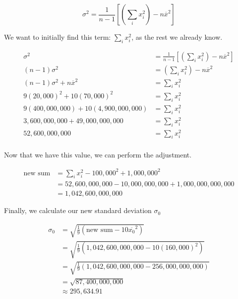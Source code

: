 \documentclass[12pt,letterpaper]{article}
\begin{document}
\begin{enumerate}
\begin{enumerate}
\begin{enumerate}[label=(\arabic*)]
              \[
                \sigma^2 = \frac{1}{n - 1} \left[\left(\sum_{i} x_i^2\right) - n \overline{x}^2\right]
              \]

              We want to initially find this term: $\sum_{i} x_i^2$, as the rest we already know.

              \begin{align*}
                \sigma^2 &= \frac{1}{n - 1} \left[\left(\sum_{i} x_i^2\right) - n \overline{x}^2\right] \\
                (n - 1) \sigma^2 &= \left(\sum_{i} x_i^2\right) - n \overline{x}^2 \\
                (n - 1) \sigma^2 + n \overline{x}^2 &= \sum_{i} x_i^2 \\
                9 (20,000)^2 + 10 (70,000)^2 &= \sum_{i} x_i^2 \\
                9 (400,000,000) + 10 (4,900,000,000) &= \sum_{i} x_i^2 \\
                3,600,000,000 + 49,000,000,000 &= \sum_{i} x_i^2 \\
                52,600,000,000 &= \sum_{i} x_i^2 \\
              \end{align*}

              Now that we have this value,
              we can perform the adjustment.

              \begin{align*}
                \text{new sum} &= \sum_i x_i^2 - 100,000^2 + 1,000,000^2 \\
                &= 52,600,000,000 - 10,000,000,000 + 1,000,000,000,000 \\
                &= 1,042,600,000,000
              \end{align*}

              Finally, we calculate our new standard deviation $\sigma_0$

              \begin{align*}
                \sigma_0 &= \sqrt{\frac{1}{9} \left(\text{new sum} - 10 \overline{x_0}^2\right)} \\
                &= \sqrt{\frac{1}{9} \left(1,042,600,000,000 - 10 (160,000)^2\right)} \\
                &= \sqrt{\frac{1}{9} \left(1,042,600,000,000 - 256,000,000,000 \right)} \\
                &= \sqrt{87,400,000,000} \\
                &\approx 295,634.91 \\
              \end{align*}


\end{enumerate}
\end{enumerate}
\end{enumerate}
\end{document}
